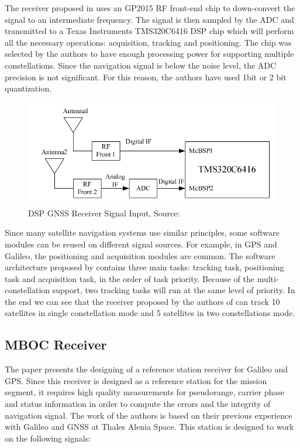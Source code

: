 The receiver proposed in \cite{dspreceiver} uses an GP2015 RF front-end chip to down-convert the signal to an intermediate frequency. The signal is then sampled by the ADC and transmitted to a Texas Instruments TMS320C6416 DSP chip which will perform all the necessary operations: acquisition, tracking and positioning. The chip was selected by the authors to have enough processing power for supporting multiple constellations. Since the navigation signal is below the noise level, the ADC precision is not significant\cite{dspreceiver}. For this reason, the authors have used 1bit or 2 bit quantization.

\begin{figure}[h]
\centering
\includegraphics[width=\textwidth]{img/dspgnsssignal.png}
\caption{DSP GNSS Receiver Signal Input, Source:\cite{dspreceiver}}
\label{fig:galileofrequencyplan}
\end{figure}

Since many satellite navigation systems use similar principles, some software modules can be reused on different signal sources. For example, in GPS and Galileo, the positioning and acquisition modules are common\cite{dspreceiver}. The software architecture proposed by \cite{dspreceiver} contains three main tasks: tracking task, positioning task and acquisition task, in the order of task priority. Because of the multi-constellation support, two tracking tasks will run at the same level of priority. In the end we can see that the receiver proposed by the authors of \cite{dspreceiver} can track 10 satellites in single constellation mode and 5 satellites in two constellations mode.

\subsection{MBOC Receiver\cite{refstationreceiver}}
\label{subsec:mbocrecv}

The paper \cite{refstationreceiver} presents the designing of a reference station receiver for Galileo and GPS. Since this receiver is designed as a reference station for the mission segment, it requires high quality measurements for pseudorange, carrier phase and status information in order to compute the errors and the integrity of navigation signal\cite{refstationreceiver}. The work of the authors is based on their previous experience with Galileo and GNSS at Thales Alenia Space. This station is designed to work on the following signals\cite{refstationreceiver}:

